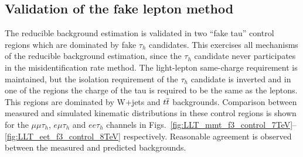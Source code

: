 %

\subsection{Validation of the fake lepton method}

The reducible background estimation is validated in two ``fake tau'' control regions which are dominated by fake $\tau_h$ candidates.
This exercises all mechanisms of the reducible background estimation, since the $\tau_h$ candidate never participates in the misidentification rate method.
The light-lepton same-charge requirement is maintained, but the isolation requirement of the $\tau_h$ candidate is inverted and in one of the regions the charge of the tau is required to be the same as the leptons.
This regions are dominated by W+jets and $t\overline{t}$ backgrounds.
Comparison between measured and simulated kinematic distributions in these control regions is shown for the $\mu\mu\tau_h$, $e\mu\tau_h$ and $ee\tau_h$ channels in Figs.~\ref{fig:LLT_mmt_f3_control_7TeV}--\ref{fig:LLT_eet_f3_control_8TeV} respectively.
Reasonable agreement is observed between the measured and predicted backgrounds.

